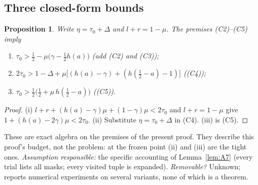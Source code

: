 \documentclass[11pt]{article}
\newtheorem{proposition}[lemma]{Proposition}
\theoremstyle{definition}
\begin{document}
\subsection{Three closed-form bounds}
\begin{proposition}\label{prop:three}
Write $\eta=\tau_0+\Delta$ and $l+r=1-\mu$. The premises \textup{(C2)--(C5)} imply
\begin{enumerate}[label=\textup{(\roman*)}]
\item $\tau_0>\tfrac12-\mu\bigl(\gamma-\tfrac12h(a)\bigr)$ \quad(add \textup{(C2)} and \textup{(C3)});
\item $2\tau_0>1-\Delta+\mu\bigl[(h(a)-\gamma)+(h(\tfrac12-a)-1)\bigr]$ \quad(\textup{(C4)});
\item $\tau_0>\tfrac12\bigl(\tfrac12+\mu\,h(\tfrac12-a)\bigr)$ \quad(\textup{(C5)}).
\end{enumerate}
\end{proposition}
\begin{proof}
(i) $l+r+(h(a)-\gamma)\mu+(1-\gamma)\mu<2\tau_0$ and $l+r=1-\mu$ give $1+(h(a)-2\gamma)\mu<2\tau_0$. (ii) Substitute
$\eta=\tau_0+\Delta$ in \textup{(C4)}. (iii) is \textup{(C5)}.
\end{proof}
These are exact algebra on the premises of the present proof. They describe this proof's budget, not the problem:
at the frozen point (ii) and (iii) are the tight ones. \emph{Assumption responsible:} the specific accounting of
Lemma~\ref{lem:A7} (every trial lists all masks; every visited tuple is expanded). \emph{Removable?} Unknown;
\cite{V} reports numerical experiments on several variants, none of which is a theorem.
\end{document}
